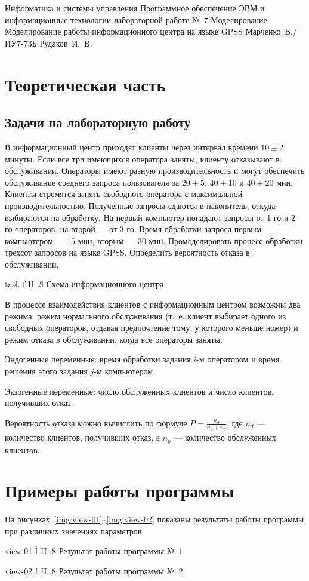 \documentclass{bmstu}
\begin{document}
\makereporttitle
    {Информатика и системы управления}
    {Программное обеспечение ЭВМ и информационные технологии}
    {лабораторной работе №~7}
    {Моделирование}
    {Моделирование работы информационного центра на языке GPSS}
    {}
    {Марченко~В./ИУ7-73Б}
    {Рудаков~И.~В.}

{\centering \maketableofcontents}

\chapter{Теоретическая часть}

\section{Задачи на лабораторную работу}

В информационный центр приходят клиенты через интервал времени $10 \pm 2$ минуты. 
Если все три имеющихся оператора заняты, клиенту отказывают в обслуживании. 
Операторы имеют разную производительность и могут обеспечить обслуживание среднего запроса пользователя за $20 \pm 5$, $40 \pm 10$ и $40 \pm 20$ мин. 
Клиенты стремятся занять свободного оператора с максимальной производительностью. 
Полученные запросы сдаются в накопитель, откуда выбираются на обработку. 
На первый компьютер попадают запросы от 1-го и 2-го операторов, на второй --- от 3-го. 
Время обработки запроса первым компьютером --- 15 мин, вторым --- 30 мин. 
Промоделировать процесс обработки трехсот запросов на языке GPSS. 
Определить вероятность отказа в обслуживании.

    {task}
    {f}
    {H}
    {.8\textwidth}
    {Схема информационного центра}

В процессе взаимодействия клиентов с информационным центром возможны два режима: режим нормального обслуживания (т.~е. клиент выбирает одного из свободных операторов, отдавая предпочтение тому, у которого меньше номер) и режим отказа в обслуживании, когда все операторы заняты.

Эндогенные переменные: время обработки задания $i$-м оператором и время решения этого задания $j$-м компьютером.

Экзогенные переменные: число обслуженных клиентов и число клиентов, получивших отказ.

Вероятность отказа можно вычислить по формуле $P = \frac{n_{d}}{n_{d} + n_{p}}$, где $n_{d}$ --- количество клиентов, получивших отказ, а $n_{p}$ --- количество обслуженных клиентов.

\chapter{Примеры работы программы}

На рисунках~\ref{img:view-01}--\ref{img:view-02} показаны результаты работы программы при различных значениях параметров.

    {view-01}
    {f}
    {H}
    {.8\textwidth}
    {Результат работы программы №~1}
    
    {view-02}
    {f}
    {H}
    {.8\textwidth}
    {Результат работы программы №~2}
\end{document}
